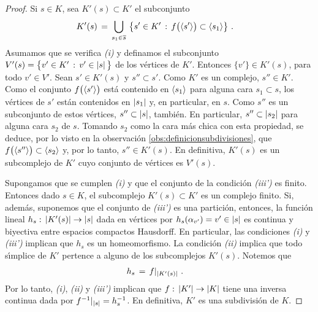 \begin{proof}
	Si $s\in K$, sea $K'(s)\subset K'$ el subconjunto
	\begin{align*}
		K'(s) & \,=\,\bigcup_{s_{1}\in\overline{s}}\,
			\big\{s'\in K'\,:\,f\big(\langle s'\rangle\big)\subset
				\langle s_{1}\rangle\big\}
		\text{ .}
	\end{align*}
	Asumamos que se verifica \emph{(i)} y definamos el subconjunto
	$V'(s) =\big\{v'\in K'\,:\,v'\in\left|s\right|\big\}$ de los v\'{e}rtices de
	$K'$. Entonces $\{v'\}\in K'(s)$, para todo $v'\in V'$.
	Sean $s'\in K'(s)$ y $s''\subset s'$.  Como $K'$ es un complejo,
	$s''\in K'$. Como el conjunto $f\big(\langle s'\rangle\big)$ est\'{a}
	contenido en $\langle s_{1}\rangle$ para alguna cara $s_{1}\subset s$,
	los v\'{e}rtices de $s'$ est\'{a}n contenidos en $\left|s_{1}\right|$ y,
	en particular, en $s$. Como $s''$ es un subconjunto de estos
	v\'{e}rtices, $s''\subset\left|s\right|$, tambi\'{e}n. En particular,
	$s''\subset\left|s_{2}\right|$ para alguna cara $s_{2}$ de $s$. Tomando
	$s_{2}$ como la cara m\'{a}s chica con esta propiedad, se deduce,
	por lo visto en la observaci\'{o}n \ref{obs:definicionsubdivisiones},
	que $f\big(\langle s''\rangle\big)\subset\langle s_{2}\rangle$ y, por
	lo tanto, $s''\in K'(s)$. En definitiva, $K'(s)$ es un subcomplejo
	de $K'$ cuyo conjunto de v\'{e}rtices es $V'(s)$.

	Supongamos que se cumplen \emph{(i)} y que el conjunto de la
	condici\'{o}n \emph{(iii')} es finito. Entonces dado $s\in K$, el
	subcomplejo $K'(s)\subset K'$ es un complejo finito. Si, adem\'{a}s,
	suponemos que el conjunto de \emph{(iii')} es una partici\'{o}n,
	entonces, la funci\'{o}n lineal
	$h_{s}:\,\left|K'(s)\right|\rightarrow\left|s\right|$ dada en v\'{e}rtices
	por $h_{s}(\alpha_{v'})=v'\in\left|s\right|$ es continua y biyectiva entre
	espacios compactos Hausdorff. En particular, las condiciones
	\emph{(i)} y \emph{(iii')} implican que $h_{s}$ es un homeomorfismo.
	La condici\'{o}n \emph{(ii)} implica que todo s\'{\i}mplice de $K'$
	pertence a alguno de los subcomplejos $K'(s)$. Notemos que
	\begin{align*}
		h_{s} & \,=\,f|_{\left|K'(s)\right|}
		\text{ .}
	\end{align*}
	Por lo tanto, \emph{(i)}, \emph{(ii)} y \emph{(iii')} implican que
	$f:\,\left|K'\right|\rightarrow\left|K\right|$ tiene una inversa continua dada
	por $f^{-1}|_{\left|s\right|}=h_{s}^{-1}$. En definitiva, $K'$ es una
	subdivisi\'{o}n de $K$.


\end{proof}
